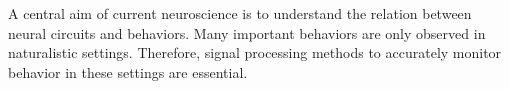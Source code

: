 A central aim of current neuroscience is to understand the relation between
neural circuits and behaviors. Many important behaviors are only observed in
naturalistic settings. Therefore, signal processing methods to accurately
monitor behavior in these settings are essential.
